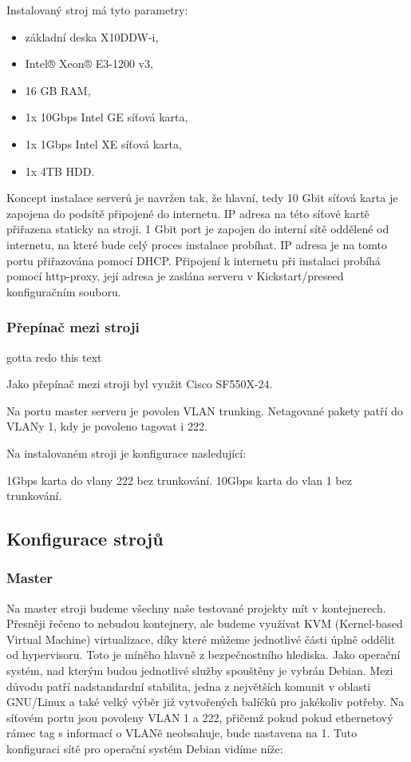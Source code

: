 \documentclass[thesis=B,czech]{FITthesis}[2012/06/26]
\begin{document}
Instalovaný stroj má tyto parametry:

\begin{itemize}
\item základní deska X10DDW-i,
\item Intel® Xeon® E3-1200 v3,
\item 16 GB RAM,
\item 1x 10Gbps Intel GE síťová karta,
\item 1x 1Gbps Intel XE síťová karta,
\item 1x 4TB HDD.
\end{itemize}

Koncept instalace serverů je navržen tak, že hlavní, tedy 10 Gbit síťová karta je zapojena do podsítě připojené do internetu. IP adresa na této síťové kartě přiřazena staticky na stroji. 1 Gbit port je zapojen do interní sítě oddělené od internetu, na které bude celý proces instalace probíhat. IP adresa je na tomto portu přiřazována pomocí DHCP. Připojení k internetu při instalaci probíhá pomocí http-proxy, její adresa je zaslána serveru v Kickstart/preseed konfiguračním souboru.


\subsubsection{Přepínač mezi stroji}

gotta redo this text

Jako přepínač mezi stroji byl využit Cisco SF550X-24.

Na portu master serveru je povolen VLAN trunking. Netagované pakety patří do VLANy 1, kdy je povoleno tagovat i 222.

Na instalovaném stroji je konfigurace nasledující:

1Gbps karta do vlany 222 bez trunkování.
10Gbps karta do vlan 1 bez trunkování.

\subsection{Konfigurace strojů}



\subsubsection{Master}

Na master stroji budeme všechny naše testované projekty mít v kontejnerech. Přesněji řečeno to nebudou kontejnery, ale budeme využívat KVM (Kernel-based Virtual Machine) virtualizace, díky které můžeme jednotlivé části úplně oddělit od hypervisoru. Toto je míněho hlavně z bezpečnostního hlediska. Jako operační systém, nad kterým budou jednotlivé služby spouštěny je vybrán Debian. Mezi důvodu patří nadstandardní stabilita, jedna z největších komunit v oblasti GNU/Linux a také velký výběr již vytvořených balíčků pro jakékoliv potřeby. Na síťovém portu jsou povoleny VLAN 1 a 222, přičemž pokud pokud ethernetový rámec tag s informací o VLANě neobsahuje, bude nastavena na 1. Tuto konfiguraci sítě pro operační systém Debian vidíme níže:
\end{document}
